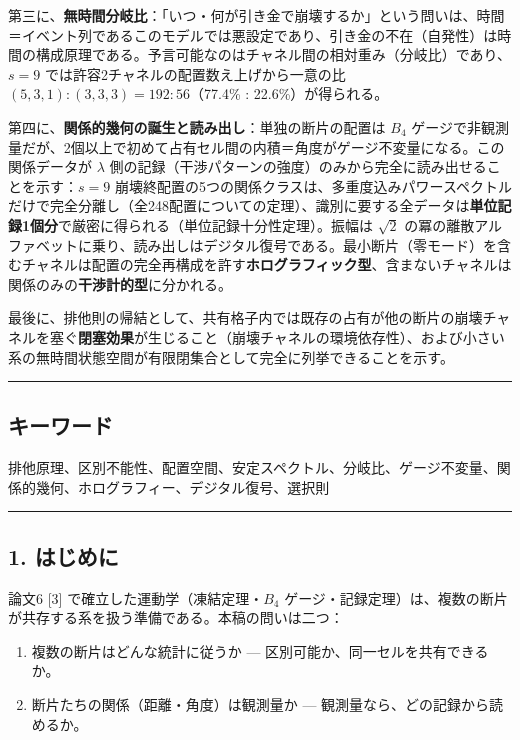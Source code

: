 \documentclass[
]{ltjsarticle}
\providecommand{\tightlist}{%
  \setlength{\itemsep}{0pt}\setlength{\parskip}{0pt}}
\begin{document}
第三に、\textbf{無時間分岐比}：「いつ・何が引き金で崩壊するか」という問いは、時間＝イベント列であるこのモデルでは悪設定であり、引き金の不在（自発性）は時間の構成原理である。予言可能なのはチャネル間の相対重み（分岐比）であり、\(s=9\)
では許容2チャネルの配置数え上げから一意の比
\((5,3,1):(3,3,3)=192:56\)（77.4\% : 22.6\%）が得られる。

第四に、\textbf{関係的幾何の誕生と読み出し}：単独の断片の配置は \(B_4\)
ゲージで非観測量だが、2個以上で初めて占有セル間の内積＝角度がゲージ不変量になる。この関係データが
\(\lambda\)
側の記録（干渉パターンの強度）のみから完全に読み出せることを示す：\(s=9\)
崩壊終配置の5つの関係クラスは、多重度込みパワースペクトルだけで完全分離し（全248配置についての定理）、識別に要する全データは\textbf{単位記録1個分}で厳密に得られる（単位記録十分性定理）。振幅は
\(\sqrt2\)
の冪の離散アルファベットに乗り、読み出しはデジタル復号である。最小断片（零モード）を含むチャネルは配置の完全再構成を許す\textbf{ホログラフィック型}、含まないチャネルは関係のみの\textbf{干渉計的型}に分かれる。

最後に、排他則の帰結として、共有格子内では既存の占有が他の断片の崩壊チャネルを塞ぐ\textbf{閉塞効果}が生じること（崩壊チャネルの環境依存性）、および小さい系の無時間状態空間が有限閉集合として完全に列挙できることを示す。

\begin{center}\rule{0.5\linewidth}{0.5pt}\end{center}

\subsection{キーワード}\label{ux30adux30fcux30efux30fcux30c9}

排他原理、区別不能性、配置空間、安定スペクトル、分岐比、ゲージ不変量、関係的幾何、ホログラフィー、デジタル復号、選択則

\begin{center}\rule{0.5\linewidth}{0.5pt}\end{center}

\subsection{1. はじめに}\label{ux306fux3058ux3081ux306b}

論文6 {[}3{]} で確立した運動学（凍結定理・\(B_4\)
ゲージ・記録定理）は、複数の断片が共存する系を扱う準備である。本稿の問いは二つ：

\begin{enumerate}
\def\labelenumi{\arabic{enumi}.}
\tightlist
\item
  複数の断片はどんな統計に従うか ---
  区別可能か、同一セルを共有できるか。
\item
  断片たちの関係（距離・角度）は観測量か ---
  観測量なら、どの記録から読めるか。
\end{enumerate}
\end{document}
